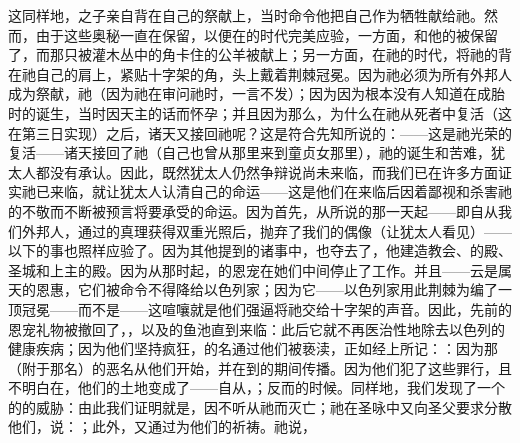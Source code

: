 这同样地，之子亲自背在自己的祭献上，当时命令他把自己作为牺牲献给祂。然而，由于这些奥秘一直在保留，以便在的时代完美应验，一方面，和他的被保留了，而那只被灌木丛中的角卡住的公羊被献上；另一方面，在祂的时代，将祂的背在祂自己的肩上，紧贴十字架的角，头上戴着荆棘冠冕。因为祂必须为所有外邦人成为祭献，祂（因为祂在审问祂时，一言不发）；因为因为根本没有人知道在成胎时的诞生，当时因天主的话而怀孕；并且因为那么，为什么在祂从死者中复活（这在第三日实现）之后，诸天又接回祂呢？这是符合先知所说的：——这是祂光荣的复活——诸天接回了祂（自己也曾从那里来到童贞女那里），祂的诞生和苦难，犹太人都没有承认。因此，既然犹太人仍然争辩说尚未来临，而我们已在许多方面证实祂已来临，就让犹太人认清自己的命运——这是他们在来临后因着鄙视和杀害祂的不敬而不断被预言将要承受的命运。因为首先，从所说的那一天起——即自从我们外邦人，通过的真理获得双重光照后，抛弃了我们的偶像（让犹太人看见）——以下的事也照样应验了。因为其他提到的诸事中，也夺去了，他建造教会、的殿、圣城和上主的殿。因为从那时起，的恩宠在她们中间停止了工作。并且——云是属天的恩惠，它们被命令不得降给以色列家；因为它——以色列家用此荆棘为编了一顶冠冕——而不是——这喧嚷就是他们强逼将祂交给十字架的声音。因此，先前的恩宠礼物被撤回了，，以及的鱼池直到来临：此后它就不再医治性地除去以色列的健康疾病；因为他们坚持疯狂，的名通过他们被亵渎，正如经上所记：：因为那（附于那名）的恶名从他们开始，并在到的期间传播。因为他们犯了这些罪行，且不明白在，他们的土地变成了——自从，；反而的时候。同样地，我们发现了一个的的威胁：由此我们证明就是，因不听从祂而灭亡；祂在圣咏中又向圣父要求分散他们，说：；此外，又通过为他们的祈祷。祂说，\par

